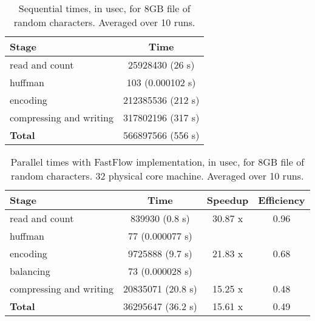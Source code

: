 \documentclass[12pt, letterpaper]{article}
\begin{document}
\begin{table}[h]
\begin{center}
\begin{tabular}{l c}
    \textbf{Stage} & \textbf{Time}  \\
    \hline
    read and count & 25928430 (26 s)\\
    \hline
    huffman & 103 (0.000102 s) \\
    \hline
    encoding & 212385536 (212 s) \\
    \hline
    compressing and writing & 317802196 (317 s) \\
    \hline
    \textbf{Total} & 566897566 (556 s) \\ 
\end{tabular}
\caption{Sequential times, in usec, for 8GB file of random characters. Averaged over 10 runs.}
\label{tab:sequential_times}
\end{center}
\end{table}


\begin{table}[h]
\begin{center}
\begin{tabular}{l c c c}
    \textbf{Stage} & \textbf{Time} & \textbf{Speedup} & \textbf{Efficiency} \\
    \hline
    read and count & 839930 (0.8 s) & 30.87 x & 0.96 \\
    \hline
    huffman & 77 (0.000077 s) &  \\
    \hline
    encoding & 9725888 (9.7 s) &  21.83 x & 0.68 \\
    \hline
    balancing & 73 (0.000028 s) &\\
    \hline
    compressing and writing & 20835071 (20.8 s) & 15.25 x & 0.48 \\
    \hline
    \textbf{Total} & 36295647 (36.2 s)  & 15.61 x & 0.49 \\ 
\end{tabular}
\caption{Parallel times with FastFlow implementation, in usec, for 8GB file of random characters. 32 physical core machine. Averaged over 10 runs.}
\label{tab:ff_times}
\end{center}
\end{table}
\end{document}
